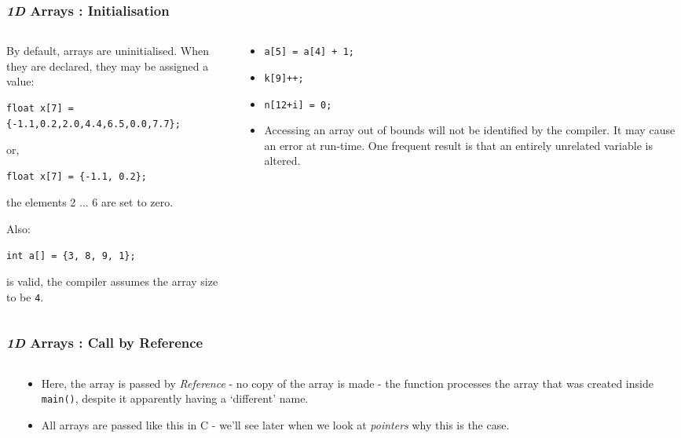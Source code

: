 
\begin{frame}[fragile]
\frametitle{{\em 1D} Arrays : Initialisation}

\begin{columns}

\begin{column}{0.45\textwidth}
By default, arrays are uninitialised.
When they are declared, they may be assigned a value:
{\small
\begin{verbatim}
float x[7] = {-1.1,0.2,2.0,4.4,6.5,0.0,7.7};
\end{verbatim}
}
or,
{\small
\begin{verbatim}
float x[7] = {-1.1, 0.2};
\end{verbatim}
}
the elements 2 ... 6 are set to zero.

Also:
{\small
\begin{verbatim}
int a[] = {3, 8, 9, 1};
\end{verbatim}
}
is valid, the compiler assumes the array size to be \verb^4^.
\end{column}

\pause
\begin{column}{0.45\textwidth}
\begin{itemize}[<+->]
\item \verb^a[5] = a[4] + 1;^
\item \verb^k[9]++;^
\item \verb^n[12+i] = 0;^
\item Accessing an array out of bounds will not be identified by
the compiler. It may cause an error at run-time.
One frequent result is that an entirely unrelated variable
is altered.
\end{itemize}
\end{column}

\end{columns}
\end{frame}



\begin{frame}[fragile]
\frametitle{{\em 1D} Arrays : Call by Reference}
\begin{columns}

\begin{column}{0.55\textwidth}

\end{column}

\pause
\begin{column}{0.35\textwidth}
\begin{itemize}[<+->]
\item Here, the array is passed by {\em Reference} - no copy of
the array is made - the function processes the array that was created inside \verb^main()^, despite
it apparently having a `different' name.
\item All arrays are passed like this in C - we'll see later when we look at {\em pointers} why this is the case.
\end{itemize}
\end{column}


\end{columns}
\end{frame}




